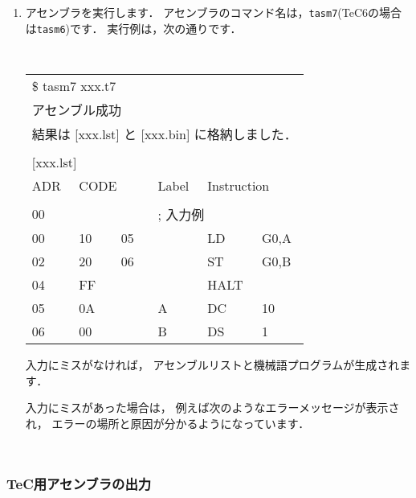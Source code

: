 \begin{enumerate}
\item アセンブラを実行します．
アセンブラのコマンド名は，{\tt tasm7}(TeC6の場合は{\tt tasm6})です．
実行例は，次の通りです．
\begin{center}
{\footnotesize\tt
\begin{tabular}{|l l l l l l|}
\hline
\multicolumn{6}{|l|}{\$ tasm7 xxx.t7} \\
\multicolumn{6}{|l|}{アセンブル成功}\\
\multicolumn{6}{|l|}{結果は [xxx.lst] と [xxx.bin] に格納しました．}\\
&&&&&\\
\multicolumn{6}{|l|}{[xxx.lst]}\\
ADR & \multicolumn{2}{l}{CODE~~~} & Label & \multicolumn{2}{l|}{Instruction}\\
&&&&&\\
00 &    &    & \multicolumn{3}{l|}{; 入力例}\\
00 & 10 & 05 &   & LD   & G0,A \\
02 & 20 & 06 &   & ST   & G0,B \\
04 & FF &    &   & HALT &      \\
05 & 0A &    & A & DC   & 10   \\
06 & 00 &    & B & DS   &  1   \\
\hline
\end{tabular}
}
\end{center}

入力にミスがなければ，
アセンブルリストと機械語プログラムが生成されます．

入力にミスがあった場合は，
例えば次のようなエラーメッセージが表示され，
エラーの場所と原因が分かるようになっています．

\begin{center}
{\footnotesize\tt
{}}
\end{center}

\end{enumerate}

\subsubsection{TeC用アセンブラの出力}

